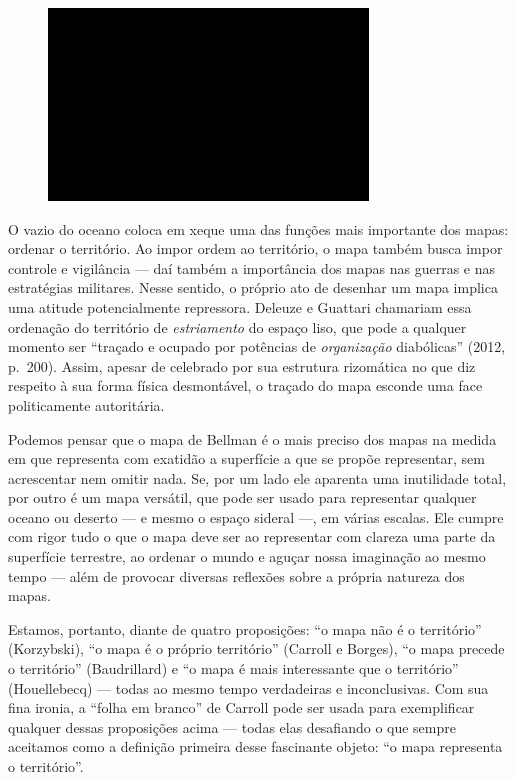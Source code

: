 \begin{figure}[!ht]
\centering
 \includegraphics[width=85mm]{./imgs/im1.jpg}
\caption{\tiny{}}
\end{figure}


O vazio do oceano coloca em xeque uma das funções mais importante dos
mapas: ordenar o território. Ao impor ordem ao território, o mapa também
busca impor controle e vigilância --- daí também a importância dos mapas
nas guerras e nas estratégias militares. Nesse sentido, o próprio ato de
desenhar um mapa implica uma atitude potencialmente repressora. Deleuze
e Guattari chamariam essa ordenação do território de \emph{estriamento}
do espaço liso, que pode a qualquer momento ser ``traçado e ocupado por
potências de \emph{organização} diabólicas'' (2012, p.~200). Assim,
apesar de celebrado por sua estrutura rizomática no que diz respeito à
sua forma física desmontável, o traçado do mapa esconde uma face
politicamente autoritária.

Podemos pensar que o mapa de Bellman é o mais preciso dos mapas na
medida em que representa com exatidão a superfície a que se propõe
representar, sem acrescentar nem omitir nada. Se, por um lado ele
aparenta uma inutilidade total, por outro é um mapa versátil, que pode
ser usado para representar qualquer oceano ou deserto --- e mesmo o
espaço sideral ---, em várias escalas. Ele cumpre com rigor tudo o que o
mapa deve ser ao representar com clareza uma parte da superfície
terrestre, ao ordenar o mundo e aguçar nossa imaginação ao mesmo tempo
--- além de provocar diversas reflexões sobre a própria natureza dos
mapas.

Estamos, portanto, diante de quatro proposições: ``o mapa não é o
território'' (Korzybski), ``o mapa é o próprio território'' (Carroll e
Borges), ``o mapa precede o território'' (Baudrillard) e ``o mapa é mais
interessante que o território'' (Houellebecq) --- todas ao mesmo tempo
verdadeiras e inconclusivas. Com sua fina ironia, a ``folha em branco''
de Carroll pode ser usada para exemplificar qualquer dessas proposições
acima --- todas elas desafiando o que sempre aceitamos como a definição
primeira desse fascinante objeto: ``o mapa representa o território''.

